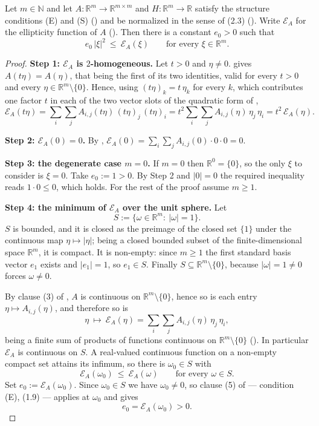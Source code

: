 \begin{theorem}
Let $m\in\mathbb N$ and let $A:\mathbb R^{m}\to\mathbb R^{m\times m}$ and
$H:\mathbb R^{m}\to\mathbb R$ satisfy the structure conditions (E) and (S)
() and be normalized in the sense of (2.3)
(). Write $\mathcal E_A$ for the ellipticity function of $A$
(). Then there is a constant $e_0>0$ such that
\[
 e_0\,|\xi|^{2}\ \le\ \mathcal E_A(\xi)\qquad\text{for every }\xi\in\mathbb R^{m}.
\]
\end{theorem}
\begin{proof}
\noindent\textbf{Step 1: $\mathcal E_A$ is $2$-homogeneous.} Let $t>0$ and $\eta\ne0$. 
gives $A(t\eta)=A(\eta)$, that being the first of its two identities, valid for every
$t>0$ and every $\eta\in\mathbb R^{m}\setminus\{0\}$. Hence, using
$(t\eta)_k=t\,\eta_k$ for every $k$, which contributes one factor $t$ in each of the two
vector slots of the quadratic form of ,
\[
 \mathcal E_A(t\eta)=\sum_{i}\sum_{j}A_{i,j}(t\eta)\,(t\eta)_j\,(t\eta)_i
  =t^{2}\sum_{i}\sum_{j}A_{i,j}(\eta)\,\eta_j\,\eta_i
  =t^{2}\,\mathcal E_A(\eta). \tag{1}
\]

\medskip\noindent\textbf{Step 2: $\mathcal E_A(0)=0$.} By ,
$\mathcal E_A(0)=\sum_i\sum_j A_{i,j}(0)\cdot0\cdot0=0$.

\medskip\noindent\textbf{Step 3: the degenerate case $m=0$.} If $m=0$ then
$\mathbb R^{0}=\{0\}$, so the only $\xi$ to consider is $\xi=0$. Take $e_0:=1>0$. By Step 2
and $|0|=0$ the required inequality reads $1\cdot0\le0$, which holds. For the rest of the
proof assume $m\ge1$.

\medskip\noindent\textbf{Step 4: the minimum of $\mathcal E_A$ over the unit sphere.} Let
\[
 S:=\{\omega\in\mathbb R^{m}:\ |\omega|=1\}.
\]
$S$ is bounded, and it is closed as the preimage of the closed set $\{1\}$ under the
continuous map $\eta\mapsto|\eta|$; being a closed bounded subset of the
finite-dimensional space $\mathbb R^{m}$, it is compact. It is non-empty: since $m\ge1$ the
first standard basis vector $e_1$ exists and $|e_1|=1$, so $e_1\in S$. Finally
$S\subseteq\mathbb R^{m}\setminus\{0\}$, because $|\omega|=1\ne0$ forces $\omega\ne0$.

By clause (3) of , $A$ is continuous on
$\mathbb R^{m}\setminus\{0\}$, hence so is each entry $\eta\mapsto A_{i,j}(\eta)$, and
therefore so is
\[
 \eta\ \longmapsto\ \mathcal E_A(\eta)=\sum_{i}\sum_{j}A_{i,j}(\eta)\,\eta_j\,\eta_i ,
\]
being a finite sum of products of functions continuous on $\mathbb R^{m}\setminus\{0\}$
(). In particular $\mathcal E_A$ is continuous on $S$. A real-valued
continuous function on a non-empty compact set attains its infimum, so there is
$\omega_0\in S$ with
\[
 \mathcal E_A(\omega_0)\ \le\ \mathcal E_A(\omega)\qquad\text{for every }\omega\in S. \tag{2}
\]
Set $e_0:=\mathcal E_A(\omega_0)$. Since $\omega_0\in S$ we have $\omega_0\ne0$, so
clause (5) of  --- condition (E), (1.9) --- applies at
$\omega_0$ and gives
\[
 e_0=\mathcal E_A(\omega_0)>0. \tag{3}
\]


\end{proof}
